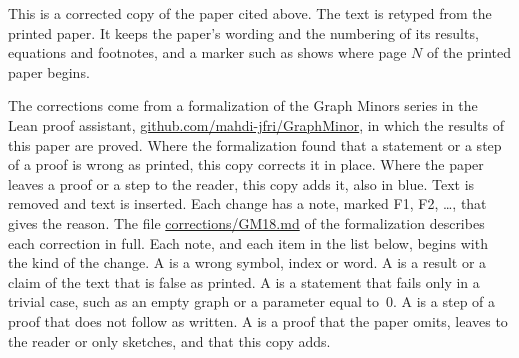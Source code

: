 
This is a corrected copy of the paper cited above. The text is retyped from the printed paper.
It keeps the paper's wording and the numbering of its results, equations and footnotes, and a
marker such as  shows where page $N$ of the printed paper begins.

The corrections come from a formalization of the Graph Minors series in the Lean proof
assistant, \href{https://github.com/mahdi-jfri/GraphMinor}{github.com/mahdi-jfri/GraphMinor},
in which the results of this paper are proved. Where the formalization found that a statement
or a step of a proof is wrong as printed, this copy corrects it in place. Where the paper leaves a proof or a step to the reader, this
copy adds it, also in blue. Text  is removed and text  is inserted. Each change has a note, marked
\textcolor{fixcolor}{\sffamily F1}, \textcolor{fixcolor}{\sffamily F2}, \dots, that gives the
reason. The file
\href{https://github.com/mahdi-jfri/GraphMinor/blob/main/corrections/GM18.md}{corrections/GM18.md}
of the formalization describes each correction in full. Each note, and each item in the list below, begins with the kind of the change. A  is a wrong symbol, index or word. A  is a result or a claim of the text that is false as printed. A  is a statement that fails only in a trivial case, such as an empty graph or a parameter equal to~$0$. A  is a step of a proof that does not follow as written. A  is a proof that the paper omits, leaves to the reader or only sketches, and that this copy adds.

